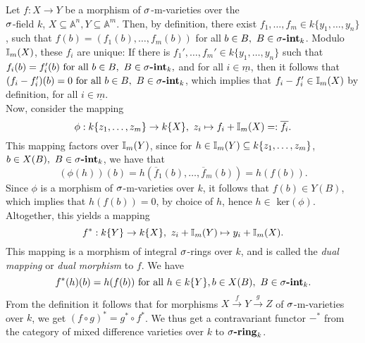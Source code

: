 \begin{rem}\label{dualmor}
Let $f: X \rightarrow Y$ be a morphism of $\sigma$-m-varieties over the \\ $\sigma$-field $k$, $X \subseteq \mathbb{A}^n, Y \subseteq \mathbb{A}^m$. Then, by definition, there exist $f_1, \ldots, f_m \in k\{y_1,\ldots,y_n\}$, such 
that $f(b) = (f_1(b),\ldots,f_m(b))$ for all $b \in B, ~ B \in \sigma\text{{\normalfont\textbf{-int}}}_k$. Modulo $\mathbb{I}_m(X)$, these $f_i$ are unique:
 If there is $f_1', \ldots, f_m' \in k\{y_1,\ldots,y_n\}$ such that $f_i(b) = f'_i(b) \text{ for all } b \in B, ~ B \in \sigma\text{{\normalfont\textbf{-int}}}_k,$ and for all $i \in \underline{m}$,
then it follows that $(f_i - f_i')(b) = 0 \text{ for all } b \in B, ~ B \in \sigma\text{{\normalfont\textbf{-int}}}_k$, which implies that $f_i - f_i' \in \mathbb{I}_m(X)$ by definition, for all $i \in \underline{m}$. \\
\indent Now, consider the mapping \[ \phi: k\{z_1,\ldots,z_m \} \rightarrow k\{X\}, ~ z_i \mapsto f_i + \mathbb{I}_m(X) =: \overline{f_i}. \]
This mapping factors over $\mathbb{I}_m(Y)$, since for $h \in \mathbb{I}_m(Y) \subseteq k\{z_1,\ldots,z_m\}$, $b \in X(B), ~ B \in \sigma\text{{\normalfont\textbf{-int}}}_k$, we have that 
\[ (\phi(h))(b) = h(\overline f_1(b), \ldots, \overline f_m(b)) = h(f(b)). \]
Since $\phi$ is a morphism of $\sigma$-m-varieties over $k$, it follows that $f(b) \in Y(B)$, which implies that $h(f(b)) = 0$, by choice of $h$, hence $h \in $ ker$(\phi)$.
Altogether, this yields a mapping 
\[ f^* : k\{Y\} \rightarrow k\{X\}, ~ z_i + \mathbb{I}_m(Y) \mapsto y_i + \mathbb{I}_m(X). \]
This mapping is a morphism of integral $\sigma$-rings over $k$, and is called the \emph{dual mapping} or \emph{dual morphism} to $f$. We have
\[ f^*(h)(b) = h(f(b)) \text{ for all } h \in k\{Y\}, b \in X(B), ~ B \in \sigma\text{{\normalfont\textbf{-int}}}_k. \]
From the definition it follows that for morphisms $X \xrightarrow{f} Y \xrightarrow{g} Z$ of $\sigma$-m-varieties over $k$, we get $ (f \circ g)^* = g^* \circ f^*$. 
We thus get a contravariant functor $-^*$ from the category of mixed difference varieties over $k$ to $\sigma\text{{\normalfont\textbf{-ring}}}_k$.
\end{rem}

